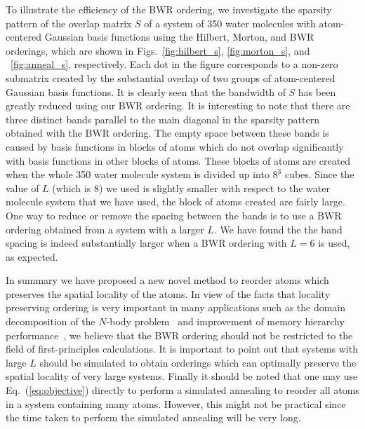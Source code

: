 \documentclass[preprint,showpacs,amssymb,aps]{revtex4}
\begin{document}
To illustrate the efficiency of the BWR ordering, 
we investigate the sparsity pattern of 
the overlap matrix $S$ of a system of 
350 water molecules with atom-centered Gaussian basis functions
using the Hilbert, Morton, and BWR orderings, which are 
shown in 
Figs.~\ref{fig:hilbert_s}, \ref{fig:morton_s}, and
~\ref{fig:anneal_s}, respectively.
Each dot in the figure corresponds to a non-zero submatrix
created by the substantial overlap of
two groups of atom-centered Gaussian basis functions.
It is clearly seen that 
the bandwidth of $S$ has been greatly reduced using our BWR ordering.
It is interesting to note that 
there are three distinct bands parallel to the main diagonal in the sparsity
pattern obtained with the BWR ordering.
The empty space between these bands is caused by basis functions in 
blocks of atoms which 
do not overlap significantly with basis functions 
in other blocks of atoms. These blocks of atoms
are created when the whole 350 water molecule system is 
divided up into $8^3$ cubes. 
Since the value of $L$ (which is 8) we used
is slightly smaller with respect to the water molecule system that we have used, 
the block of atoms created are
fairly large. One way to reduce or remove the spacing between the 
bands is to use a BWR ordering obtained from a system 
with a larger $L$. We have found the the 
band spacing is indeed substantially larger
when a BWR ordering with $L=6$ is used, as expected.

In summary we have proposed a new novel method to reorder atoms which 
preserves the spatial locality of the atoms.
In view of the facts that locality preserving ordering is 
very important in many applications such as the domain decomposition of the
$N$-body problem~\cite{Warren_95v87} and 
improvement of memory hierarchy performance~\cite{Mellor-Crummey_01v29},
we believe that the BWR ordering should not be restricted
to the field of first-principles calculations.
It is important to point out that systems with large $L$ should be 
simulated to obtain orderings which can optimally 
preserve the spatial locality 
of very large systems.
Finally it should be noted that one may use Eq.~(\ref{eq:objective}) 
directly to perform a simulated annealing to reorder all 
atoms in a system containing many atoms. 
However, this might not be practical
since the time taken to perform the simulated annealing will be 
very long.
\end{document}
